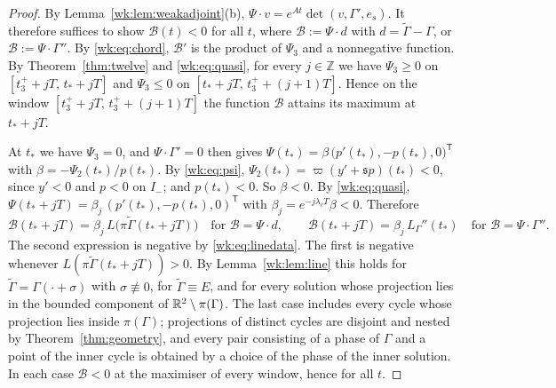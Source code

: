 \begin{proof}
By Lemma~\ref{wk:lem:weakadjoint}(b), $\Psi\cdot v=e^{At}\det(v,\Gamma',e_s)$. It therefore suffices to show $\mathcal B(t)<0$ for all $t$, where $\mathcal B:=\Psi\cdot d$ with $d=\tilde\Gamma-\Gamma$, or $\mathcal B:=\Psi\cdot\Gamma''$. By \eqref{wk:eq:chord}, $\mathcal B'$ is the product of $\Psi_3$ and a nonnegative function. By Theorem~\ref{thm:twelve} and \eqref{wk:eq:quasi}, for every $j\in\mathbb Z$ we have $\Psi_3\ge0$ on $[t_3^++jT,\,t_\ast+jT]$ and $\Psi_3\le0$ on $[t_\ast+jT,\,t_3^++(j+1)T]$. Hence on the window $[t_3^++jT,\,t_3^++(j+1)T]$ the function $\mathcal B$ attains its maximum at $t_\ast+jT$.

At $t_\ast$ we have $\Psi_3=0$, and $\Psi\cdot\Gamma'=0$ then gives $\Psi(t_\ast)=\beta\,\bigl(p'(t_\ast),-p(t_\ast),0\bigr)^{\mathsf T}$ with $\beta=-\Psi_2(t_\ast)/p(t_\ast)$. By \eqref{wk:eq:psi}, $\Psi_2(t_\ast)=\varpi(y'+\mathfrak sp)(t_\ast)<0$, since $y'<0$ and $p<0$ on $I_-$; and $p(t_\ast)<0$. So $\beta<0$. By \eqref{wk:eq:quasi}, $\Psi(t_\ast+jT)=\beta_j\,(p'(t_\ast),-p(t_\ast),0)^{\mathsf T}$ with $\beta_j=e^{-j\lambda_cT}\beta<0$. Therefore
\[
\mathcal B(t_\ast+jT)=\beta_j\,L\bigl(\pi\tilde\Gamma(t_\ast+jT)\bigr)\quad\text{for }\mathcal B=\Psi\cdot d,\qquad
\mathcal B(t_\ast+jT)=\beta_j\,L_\Gamma''(t_\ast)\quad\text{for }\mathcal B=\Psi\cdot\Gamma'' .
\]
The second expression is negative by \eqref{wk:eq:linedata}. The first is negative whenever $L(\pi\tilde\Gamma(t_\ast+jT))>0$. By Lemma~\ref{wk:lem:line} this holds for $\tilde\Gamma=\Gamma(\cdot+\sigma)$ with $\sigma\not\equiv0$, for $\tilde\Gamma\equiv E$, and for every solution whose projection lies in the bounded component of $\mathbb R^2\setminus\pi(\Gamma)$. The last case includes every cycle whose projection lies inside $\pi(\Gamma)$; projections of distinct cycles are disjoint and nested by Theorem~\ref{thm:geometry}, and every pair consisting of a phase of $\Gamma$ and a point of the inner cycle is obtained by a choice of the phase of the inner solution. In each case $\mathcal B<0$ at the maximiser of every window, hence for all $t$.
\end{proof}

